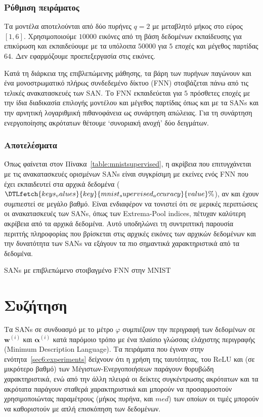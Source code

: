 \subsubsection{Ρύθμιση πειράματος}
Τα μοντέλα αποτελούνται από δύο πυρήνες $q = 2$ με μεταβλητό μήκος στο εύρος $[1, 6]$.
Χρησιμοποιούμε $10000$ εικόνες από τη βάση δεδομένων εκπαίδευσης για επικύρωση και εκπαιδεύουμε με τα υπόλοιπα $50000$ για $5$ εποχές και μέγεθος παρτίδας $64$.
Δεν εφαρμόζουμε προεπεξεργασία στις εικόνες.

Κατά τη διάρκεια της επιβλεπώμενης μάθησης, τα βάρη των πυρήνων παγώνουν και ένα μονοστρωματικό πλήρως συνδεδεμένο δίκτυο (FNN) στοιβάζεται πάνω από τις τελικές ανακατασκευές των SAN\@.
Το FNN εκπαιδεύεται για $5$ πρόσθετες εποχές με την ίδια διαδικασία επιλογής μοντέλου και μέγεθος παρτίδας όπως και με τα SANs και την αρνητική λογαριθμική πιθανοφάνεια ως συνάρτηση απώλειας.
Για τη συνάρτηση ενεργοποίησης ακρότατων θέτουμε `συνοριακή ανοχή' δύο δειγμάτων.

\subsubsection{Αποτελέσματα}
Όπως φαίνεται στον Πίνακα~\ref{table:mnistsupervised}, η ακρίβεια που επιτυγχάνεται με τις ανακατασκευές ορισμένων SANs είναι συγκρίσιμη με εκείνες ενός FNN που έχει εκπαιδευτεί στα αρχικά δεδομένα ($\DTLfetch{keys_values}{key}{mnist_supervised_accuracy}{value}\%$), αν και έχουν συμπιεστεί σε μεγάλο βαθμό.
Είναι ενδιαφέρον να τονιστεί ότι σε μερικές περιπτώσεις οι ανακατασκευές των SANs, όπως των Extrema-Pool indices, πέτυχαν καλύτερη ακρίβεια από τα αρχικά δεδομένα.
Αυτό υποδηλώνει τη συντριπτική παρουσία περιττής πληροφορίας που βρίσκεται στις αρχικές εικόνες των αρχικών δεδομένων και την δυνατότητα των SANs να εξάγουν τα πιο σημαντικά χαρακτηριστικά από τα δεδομένα.

\begin{table}
	\centering
	\caption{SANs με επιβλεπώμενο στοιβαγμένο FNN στην MNIST}
	\label{table:mnistsupervised}
	
\end{table}

\section{Συζήτηση}
\label{sec6:discussion}
Τα SANs σε συνδυασμό με το μέτρο $\varphi$ συμπιέζουν την περιγραφή των δεδομένων σε $\bm{w}^{(i)}$ και $\bm{\alpha}^{(i)}$ κατά παρόμοιο τρόπο με ένα πλαίσιο γλώσσας ελάχιστης περιγραφής (Minimum Description Language).
Τα πειράματα που έγιναν στην ενότητα~\ref{sec6:experiments} δείχνουν ότι η χρήση της ταυτότητας, του ReLU και (σε μικρότερο βαθμό) των Μέγιστων-Ενεργοποιήσεων παράγουν θορυβώδη χαρακτηριστικά, ενώ από την άλλη πλευρά οι δείκτες συγκέντρωσης ακρότατων και τα ακρότατα παράγουν σταθερά χαρακτηριστικά και μπορούν να προσαρμοστούν χρησιμοποιώντας παραμέτρους (μήκος πυρήνα, και $med$) των οποίων οι τιμές μπορούν να καθοριστούν με απλή επισκόπηση των δεδομένων.

